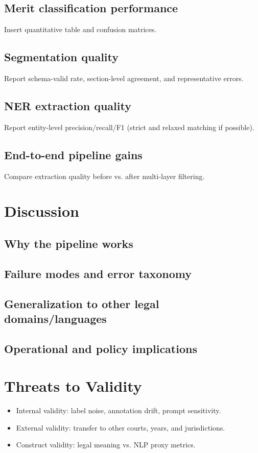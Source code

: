 \documentclass[a4paper,fleqn]{cas-sc}
\begin{document}
\subsection{Merit classification performance}
Insert quantitative table and confusion matrices.

\subsection{Segmentation quality}
Report schema-valid rate, section-level agreement, and representative errors.

\subsection{NER extraction quality}
Report entity-level precision/recall/F1 (strict and relaxed matching if possible).

\subsection{End-to-end pipeline gains}
Compare extraction quality before vs. after multi-layer filtering.

\section{Discussion}
\label{sec:discussion}
\subsection{Why the pipeline works}
\subsection{Failure modes and error taxonomy}
\subsection{Generalization to other legal domains/languages}
\subsection{Operational and policy implications}

\section{Threats to Validity}
\label{sec:validity}
\begin{itemize}
    \item Internal validity: label noise, annotation drift, prompt sensitivity.
    \item External validity: transfer to other courts, years, and jurisdictions.
    \item Construct validity: legal meaning vs. NLP proxy metrics.
\end{itemize}
\end{document}
